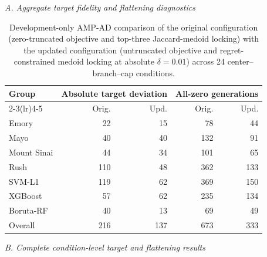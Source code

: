 \begin{table}[p]
\centering
\caption{Development-only AMP-AD comparison of the original configuration (zero-truncated objective and top-three Jaccard-medoid locking) with the updated configuration (untruncated objective and regret-constrained medoid locking at absolute $\delta=0.01$) across 24 center--branch--cap conditions.}
\label{tab:supp16}
\scriptsize
\setlength{\tabcolsep}{2.6pt}
\renewcommand{\arraystretch}{1.03}
\textit{A. Aggregate target fidelity and flattening diagnostics}\par\smallskip
\begin{tabular}{lrrrr}
\toprule
Group & \multicolumn{2}{c}{Absolute target deviation} & \multicolumn{2}{c}{All-zero generations} \\
\cmidrule(lr){2-3}\cmidrule(lr){4-5}
 & Orig. & Upd. & Orig. & Upd. \\
\midrule
Emory & 22 & 15 & 78 & 44 \\
Mayo & 40 & 40 & 132 & 91 \\
Mount Sinai & 44 & 34 & 101 & 65 \\
Rush & 110 & 48 & 362 & 133 \\
\midrule
SVM-L1 & 119 & 62 & 369 & 150 \\
XGBoost & 57 & 62 & 235 & 134 \\
Boruta-RF & 40 & 13 & 69 & 49 \\
\midrule
Overall & 216 & 137 & 673 & 333 \\
\bottomrule
\end{tabular}\par
\vspace{0.75em}
\textit{B. Complete condition-level target and flattening results}\par\smallskip
{}
\end{table}
